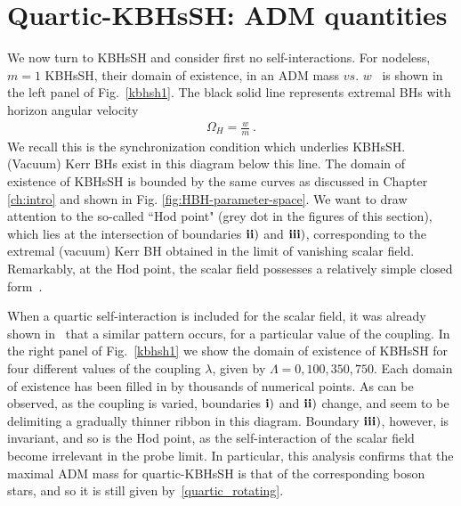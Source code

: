 \section{Quartic-KBHsSH: ADM quantities}
\label{sec_III}
We now turn to KBHsSH and consider first no self-interactions. For nodeless, $m=1$ KBHsSH, their domain of existence, in an ADM mass $vs.$ $w$~\cite{Herdeiro:2014goa,Herdeiro:2015gia} is shown in the left panel of Fig.~\ref{kbhsh1}.  The black solid line represents extremal BHs {with horizon angular velocity}
\begin{eqnarray}
\label{SIcond}
 \Omega_H=\frac{w}{m} \ .
\end{eqnarray} 
We recall this is the synchronization condition which underlies KBHsSH. (Vacuum) Kerr BHs exist in this diagram below this line.
The domain of existence of KBHsSH is bounded by the same curves as discussed in Chapter \ref{ch:intro} and shown in Fig. \ref{fig:HBH-parameter-space}.
We want to draw attention to the so-called ``Hod point" (grey dot in the figures of this section), which lies at the intersection of boundaries ${\bf ii)}$ and ${\bf iii)}$, corresponding to the extremal (vacuum) Kerr BH obtained in the limit of vanishing scalar field.
Remarkably, at the Hod point, the scalar field possesses a relatively simple closed form~\cite{Hod:2012px}.


When a quartic self-interaction is included for the scalar field, it was already shown in~\cite{Kleihaus:2015iea} that a similar pattern occurs, for a particular value of the coupling. In the right panel of Fig.~\ref{kbhsh1} we show the domain of existence of KBHsSH for four different values of the coupling $\lambda$, given by $\Lambda=0,100,350,750$. Each domain of existence has been filled in by thousands of numerical points. As can be observed, as the coupling is varied, boundaries  ${\bf i)}$ and ${\bf ii)}$ change, and seem to be delimiting a gradually thinner ribbon in this diagram. Boundary  ${\bf iii)}$, however, is invariant, and so is the Hod point, as the self-interaction of the scalar field become irrelevant in the probe limit. In particular, this analysis confirms that the maximal ADM mass for quartic-KBHsSH is that of the corresponding boson stars, and so it is still given by~\eqref{quartic_rotating}.





